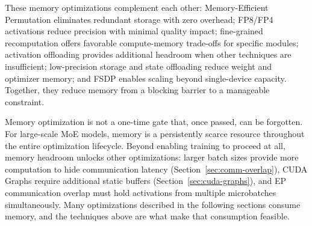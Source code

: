 These memory optimizations complement each other: Memory-Efficient Permutation eliminates redundant storage with zero overhead; FP8/FP4 activations reduce precision with minimal quality impact; fine-grained recomputation offers favorable compute-memory trade-offs for specific modules; activation offloading provides additional headroom when other techniques are insufficient; low-precision storage and state offloading reduce weight and optimizer memory; and FSDP enables scaling beyond single-device capacity. Together, they reduce memory from a blocking barrier to a manageable constraint.

Memory optimization is not a one-time gate that, once passed, can be forgotten. For large-scale MoE models, memory is a persistently scarce resource throughout the entire optimization lifecycle. Beyond enabling training to proceed at all, memory headroom unlocks other optimizations: larger batch sizes provide more computation to hide communication latency (Section~\ref{sec:comm-overlap}), CUDA Graphs require additional static buffers (Section~\ref{sec:cuda-graphs}), and EP communication overlap must hold activations from multiple microbatches simultaneously. Many optimizations described in the following sections consume memory, and the techniques above are what make that consumption feasible.

